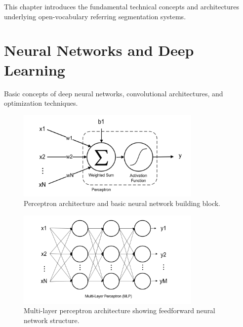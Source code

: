 \cleardoublepage
\label{chap:back}

This chapter introduces the fundamental technical concepts and architectures underlying open-vocabulary referring segmentation systems.

\section{Neural Networks and Deep Learning}

Basic concepts of deep neural networks, convolutional architectures, and optimization techniques.

\begin{figure}[htbp]
\centering
\includegraphics[width=0.8\textwidth]{Images/perceptron.png}
\caption{Perceptron architecture and basic neural network building block.}
\label{fig:perceptron}
\end{figure}

\begin{figure}[htbp]
\centering
\includegraphics[width=0.8\textwidth]{Images/mlp.png}
\caption{Multi-layer perceptron architecture showing feedforward neural network structure.}
\label{fig:mlp}
\end{figure}

